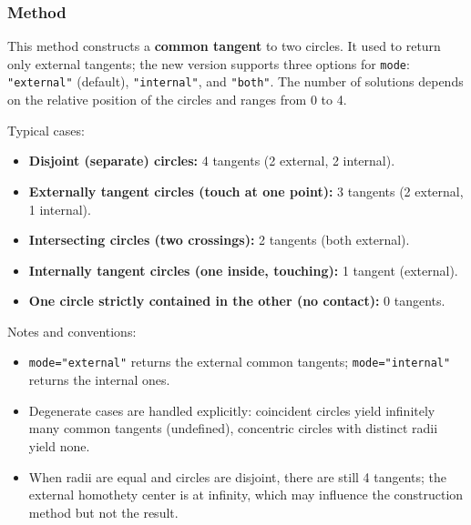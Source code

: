 \subsubsection{Method }
\label{ssub:common_tangent}

This method constructs a \textbf{common tangent} to two circles.
It used to return only external tangents; the new version supports three options for \verb|mode|:
\verb|"external"| (default), \verb|"internal"|, and \verb|"both"|.
The number of solutions depends on the relative position of the circles and ranges from 0 to 4.
\medskip

Typical cases:
\begin{itemize}
\small
\item \textbf{Disjoint (separate) circles:} 4 tangents (2 external, 2 internal).
\item \textbf{Externally tangent circles (touch at one point):} 3 tangents (2 external, 1 internal).
\item \textbf{Intersecting circles (two crossings):} 2 tangents (both external).
\item \textbf{Internally tangent circles (one inside, touching):} 1 tangent (external).
\item \textbf{One circle strictly contained in the other (no contact):} 0 tangents.
\end{itemize}

Notes and conventions:
\begin{itemize}
\item \verb|mode="external"| returns the external common tangents; \verb|mode="internal"| returns the internal ones.
\item Degenerate cases are handled explicitly: coincident circles yield infinitely many common tangents (undefined), concentric circles with distinct radii yield none.
\item When radii are equal and circles are disjoint, there are still 4 tangents; the external homothety center is at infinity, which may influence the construction method but not the result.
\end{itemize}

\medskip


\begin{tkzexample}[latex=.45\textwidth]
\begin{center}
\end{center}
\end{tkzexample}


